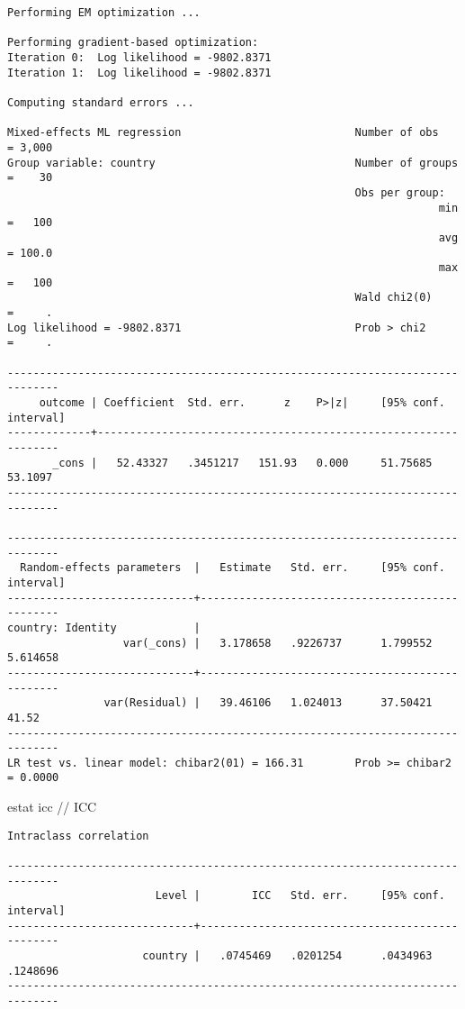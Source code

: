 \documentclass[
  letterpaper,
  DIV=11,
  numbers=noendperiod]{scrreprt}
\newenvironment{Shaded}{\begin{snugshade}}{\end{snugshade}}
\newcommand{\CommentTok}[1]{\textcolor[rgb]{0.37,0.37,0.37}{#1}}
\newcommand{\KeywordTok}[1]{\textcolor[rgb]{0.00,0.23,0.31}{#1}}
\newcommand{\NormalTok}[1]{\textcolor[rgb]{0.00,0.23,0.31}{#1}}
\begin{document}
\begin{verbatim}
Performing EM optimization ...

Performing gradient-based optimization: 
Iteration 0:  Log likelihood = -9802.8371  
Iteration 1:  Log likelihood = -9802.8371  

Computing standard errors ...

Mixed-effects ML regression                           Number of obs    = 3,000
Group variable: country                               Number of groups =    30
                                                      Obs per group:
                                                                   min =   100
                                                                   avg = 100.0
                                                                   max =   100
                                                      Wald chi2(0)     =     .
Log likelihood = -9802.8371                           Prob > chi2      =     .

------------------------------------------------------------------------------
     outcome | Coefficient  Std. err.      z    P>|z|     [95% conf. interval]
-------------+----------------------------------------------------------------
       _cons |   52.43327   .3451217   151.93   0.000     51.75685     53.1097
------------------------------------------------------------------------------

------------------------------------------------------------------------------
  Random-effects parameters  |   Estimate   Std. err.     [95% conf. interval]
-----------------------------+------------------------------------------------
country: Identity            |
                  var(_cons) |   3.178658   .9226737      1.799552    5.614658
-----------------------------+------------------------------------------------
               var(Residual) |   39.46106   1.024013      37.50421       41.52
------------------------------------------------------------------------------
LR test vs. linear model: chibar2(01) = 166.31        Prob >= chibar2 = 0.0000
\end{verbatim}

\begin{Shaded}
\begin{Highlighting}[]
  
\KeywordTok{estat}\NormalTok{ icc }\CommentTok{// ICC}
\end{Highlighting}
\end{Shaded}

\begin{verbatim}
Intraclass correlation

------------------------------------------------------------------------------
                       Level |        ICC   Std. err.     [95% conf. interval]
-----------------------------+------------------------------------------------
                     country |   .0745469   .0201254      .0434963    .1248696
------------------------------------------------------------------------------
\end{verbatim}
\end{document}
